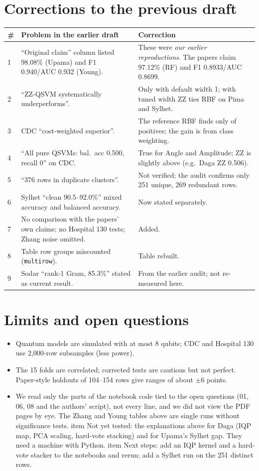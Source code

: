\documentclass[11pt,a4paper]{article}
\begin{document}
\section{Corrections to the previous draft}
\begin{table}[H]\centering\scriptsize\begin{tabular}{p{0.3cm}p{6.2cm}p{7.5cm}}\toprule \# & Problem in the earlier draft & Correction\\\midrule
1 & ``Original claim'' column listed 98.08\% (Upama) and F1 0.940/AUC 0.932 (Young). & These were \emph{our earlier reproductions}. The papers claim 97.12\% (RF) and F1 0.8933/AUC 0.8699.\\
2 & ``ZZ-QSVM systematically underperforms''. & Only with default width 1; with tuned width ZZ ties RBF on Pima and Sylhet.\\
3 & CDC ``cost-weighted superior''. & The reference RBF finds only \mCdcRBFrec{} of positives; the gain is from class weighting.\\
4 & ``All pure QSVMs: bal.\ acc 0.500, recall 0'' on CDC. & True for Angle and Amplitude; ZZ is slightly above (e.g.\ Daga ZZ 0.506).\\
5 & ``376 rows in duplicate clusters''. & Not verified; the audit confirms only 251 unique, 269 redundant rows.\\
6 & Sylhet ``clean 90.5--92.0\%'' mixed accuracy and balanced accuracy. & Now stated separately.\\
7 & No comparison with the papers' own claims; no Hospital 130 tests; Zhang noise omitted. & Added.\\
8 & Table row groups miscounted (\texttt{multirow}). & Table rebuilt.\\
9 & Sodar ``rank-1 Gram, 85.3\%'' stated as current result. & From the earlier audit; not re-measured here.\\\bottomrule\end{tabular}\end{table}

\section{Limits and open questions}
\begin{itemize}[leftmargin=1.5em]
\item Quantum models are simulated with at most 8 qubits; CDC and Hospital 130 use 2,000-row subsamples (less power).
\item The 15 folds are correlated; corrected tests are cautious but not perfect. Paper-style holdouts of 104--154 rows give ranges of about $\pm$6 points.
\item We read only the parts of the notebook code tied to the open questions (01, 06, 08 and the authors' script), not every line, and we did not view the PDF pages by eye. The Zhang and Young tables above are single runs without significance tests.
item Not yet tested: the explanations above for Daga (IQP map, PCA scaling, hard-vote stacking) and for Upama's Sylhet gap. They need a machine with Python.
item Next steps: add an IQP kernel and a hard-vote stacker to the notebooks and rerun; add a Sylhet run on the 251 distinct rows.
\end{itemize}
\end{document}
